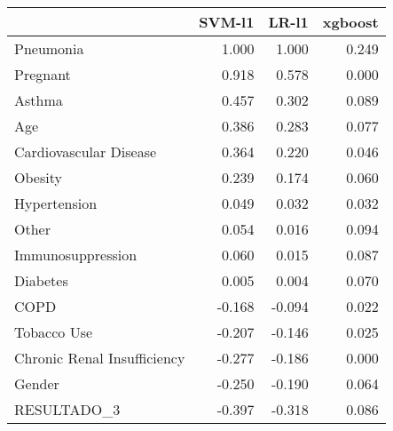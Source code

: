 \begin{tabular}{lrrr}
\toprule
{} &  SVM-l1 &  LR-l1 &  xgboost \\
\midrule
Pneumonia                   &   1.000 &  1.000 &    0.249 \\
Pregnant                    &   0.918 &  0.578 &    0.000 \\
Asthma                      &   0.457 &  0.302 &    0.089 \\
Age                         &   0.386 &  0.283 &    0.077 \\
Cardiovascular Disease      &   0.364 &  0.220 &    0.046 \\
Obesity                     &   0.239 &  0.174 &    0.060 \\
Hypertension                &   0.049 &  0.032 &    0.032 \\
Other                       &   0.054 &  0.016 &    0.094 \\
Immunosuppression           &   0.060 &  0.015 &    0.087 \\
Diabetes                    &   0.005 &  0.004 &    0.070 \\
COPD                        &  -0.168 & -0.094 &    0.022 \\
Tobacco Use                 &  -0.207 & -0.146 &    0.025 \\
Chronic Renal Insufficiency &  -0.277 & -0.186 &    0.000 \\
Gender                      &  -0.250 & -0.190 &    0.064 \\
RESULTADO\_3                 &  -0.397 & -0.318 &    0.086 \\
\bottomrule
\end{tabular}
